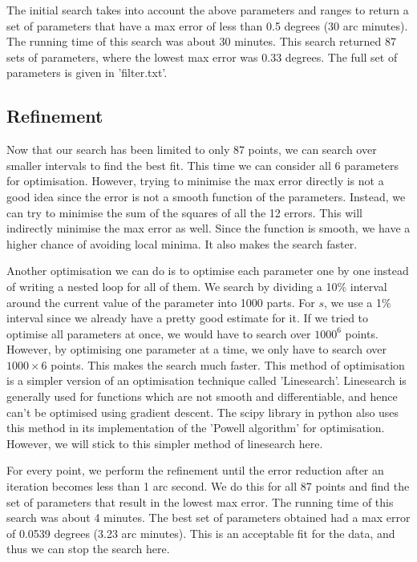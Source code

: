 \documentclass[12pt]{article}
\begin{document}
The initial search takes into account the above parameters and ranges to return a set of parameters that have a max error of less than 0.5 degrees (30 arc minutes). The running time of this search was about 30 minutes. This search returned 87 sets of parameters, where the lowest max error was 0.33 degrees. The full set of parameters is given in 'filter.txt'.

\subsection*{Refinement}
Now that our search has been limited to only 87 points, we can search over smaller intervals to find the best fit. This time we can consider all 6 parameters for optimisation. However, trying to minimise the max error directly is not a good idea since the error is not a smooth function of the parameters. Instead, we can try to minimise the sum of the squares of all the 12 errors. This will indirectly minimise the max error as well. Since the function is smooth, we have a higher chance of avoiding local minima. It also makes the search faster.

Another optimisation we can do is to optimise each parameter one by one instead of writing a nested loop for all of them. We search by dividing a 10\% interval around the current value of the parameter into 1000 parts. For $s$, we use a 1\% interval since we already have a pretty good estimate for it. If we tried to optimise all parameters at once, we would have to search over $1000^6$ points. However, by optimising one parameter at a time, we only have to search over $1000 \times 6$ points. This makes the search much faster. This method of optimisation is a simpler version of an optimisation technique called 'Linesearch'. Linesearch is generally used for functions which are not smooth and differentiable, and hence can't be optimised using gradient descent. The scipy library in python also uses this method in its implementation of the 'Powell algorithm' for optimisation. However, we will stick to this simpler method of linesearch here.

For every point, we perform the refinement until the error reduction after an iteration becomes less than 1 arc second. We do this for all 87 points and find the set of parameters that result in the lowest max error. The running time of this search was about 4 minutes. The best set of parameters obtained had a max error of 0.0539 degrees (3.23 arc minutes). This is an acceptable fit for the data, and thus we can stop the search here.
\end{document}
